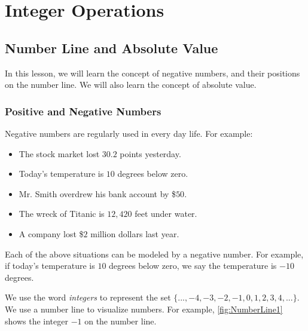 
\chapter{Integer Operations}
\thispagestyle{fancy}
\section{Number Line and Absolute Value}

In this lesson, we will learn the concept of negative numbers, and their positions on the number line. We will also learn the concept of absolute value.

\subsection{Positive and Negative Numbers}

Negative numbers are regularly used in every day life. For example:

\begin{itemize}
\item The stock market lost $30.2$ points yesterday.
\item Today's temperature is $10$ degrees below zero.
\item Mr. Smith overdrew his bank account by \$$50$.
\item The wreck of Titanic is $12,420$ feet under water.
\item A company lost \$$2$ million dollars last year.
\end{itemize}

Each of the above situations can be modeled by a negative number. For example, if today's temperature is $10$ degrees below zero, we say the temperature is $-10$ degrees.

We use the word \textit{integers} to represent the set $\{...,-4,-3,-2,-1,0,1,2,3,4,...\}$. We use a number line to visualize numbers. For example, \cref{fig:NumberLine1} shows the integer $-1$ on the number line.

\begin{tightcenter}
	\label{fig:NumberLine1}
\end{tightcenter}


